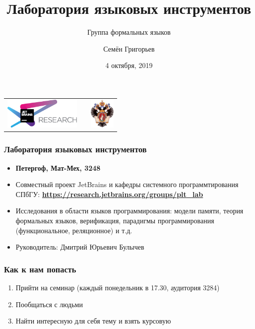 \documentclass[xcolor=table]{beamer}
\title[JBR PLT lab]{Лаборатория языковых инструментов}
\subtitle[]{Группа формальных языков}
\institute[JetBrains Research]{
JetBrains Research, Programming Languages and Tools Lab  \\
Saint Petersburg University
}
\author[Семён Григорьев]{Семён Григорьев}
\date{4 октября, 2019}
\begin{document}
{
\begin{frame}[fragile]
  \begin{table}
  \centering
  \begin{tabularx}{\linewidth}{YcX}
    \includegraphics[height=1.5cm]{pictures/jetbrainsResearch.pdf} \hfill
    & \begin{minipage}[t]{0.3\textwidth}
      \end{minipage}
    & \hfill \includegraphics[height=1.5cm]{pictures/SPbGU_Logo.png}
  \end{tabularx}
  \end{table}
  \titlepage
\end{frame}
}

\begin{frame} \frametitle{Лаборатория языковых инструментов}
  \begin{itemize}
        \item \textbf{Петергоф, Мат-Мех, 3248}
        \item Совместный проект JetBrains и кафедры системного программтирования СПбГУ: \textbf{\url{https://research.jetbrains.org/groups/plt_lab}}
        \item Исследования в области языков программирования: модели памяти, теория формальных языков, верификация, парадигмы программирования (функциональное, реляционное) и т.д.
        \item Руководитель: Дмитрий Юрьевич Булычев
  \end{itemize}

\end{frame}

\begin{frame}[fragile] \frametitle{Как к нам попасть}
    \begin{enumerate}
      \item Прийти на семинар (каждый понедельник в 17.30, аудитория 3284)
      \item Пообщаться с людьми
      \item Найти интересную для себя тему и взять курсовую
    \end{enumerate}
\end{frame}
\end{document}
